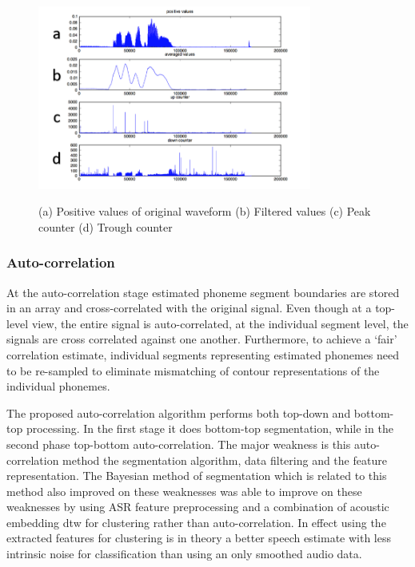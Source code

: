 \begin{figure}
\centering
  \includegraphics[width=9cm]{thesis/images/corr00}\\
  \caption{(a) Positive values of original waveform (b) Filtered values (c) Peak counter (d) Trough counter}\label{fig_c3_exp02}
\end{figure}
\subsubsection{Auto-correlation}
At the auto-correlation stage estimated phoneme segment boundaries are stored in an array and cross-correlated with the original signal.  Even though at a top-level view, the entire signal is auto-correlated, at the individual segment level, the signals are cross correlated against one another.  Furthermore, to achieve a ‘fair’ correlation estimate, individual segments representing estimated phonemes need to be re-sampled to eliminate mismatching of contour representations of the individual phonemes.

The proposed auto-correlation algorithm performs both top-down and bottom-top processing.  In the first stage it does bottom-top segmentation, while in the second phase top-bottom auto-correlation.   The major weakness is this auto-correlation method the segmentation algorithm, data filtering and the feature representation.  The Bayesian method of segmentation \citep{kamper2016unsupervised} which is related to this method also improved on these weaknesses was able to improve on these weaknesses by using ASR feature preprocessing and a combination of acoustic embedding \acrfull{dtw} for clustering rather than auto-correlation.  In effect using the extracted features for clustering is in theory a better speech estimate with less intrinsic noise for classification than using an only smoothed audio data.

